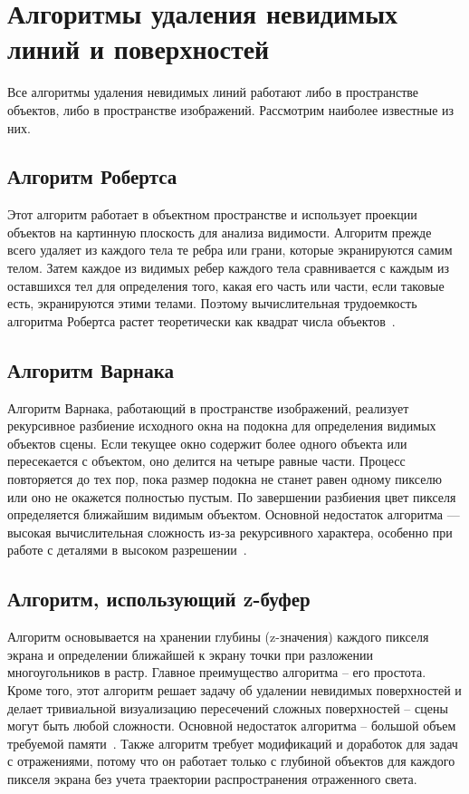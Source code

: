 \section{Алгоритмы удаления невидимых линий и поверхностей}
Все алгоритмы удаления невидимых линий работают либо в пространстве объектов, либо в пространстве изображений. Рассмотрим наиболее известные из них.
\subsection{Алгоритм Робертса}
Этот алгоритм работает в объектном пространстве и использует проекции объектов на картинную плоскость для анализа видимости. Алгоритм прежде всего удаляет из каждого тела те ребра или грани, которые экранируются самим телом. Затем каждое из видимых ребер каждого тела сравнивается с каждым из оставшихся тел для определения того, какая его часть или части, если таковые есть, экранируются этими телами. Поэтому вычислительная трудоемкость алгоритма Робертса растет теоретически как квадрат числа объектов~\cite{lit1,lit2}.

\subsection{Алгоритм Варнака}
Алгоритм Варнака, работающий в пространстве изображений, реализует рекурсивное разбиение исходного окна на подокна для определения видимых объектов сцены. Если текущее окно содержит более одного объекта или пересекается с объектом, оно делится на четыре равные части. Процесс повторяется до тех пор, пока размер подокна не станет равен одному пикселю или оно не окажется полностью пустым. По завершении разбиения цвет пикселя определяется ближайшим видимым объектом. Основной недостаток алгоритма — высокая вычислительная сложность из-за рекурсивного характера, особенно при работе с деталями в высоком разрешении~\cite{lit3}.

\subsection{Алгоритм, использующий z-буфер}

Алгоритм основывается на хранении глубины (z-значения) каждого пикселя экрана и определении ближайшей к экрану точки при разложении многоугольников в растр.
Главное преимущество алгоритма -- его простота. Кроме того, этот алгоритм решает задачу об удалении невидимых поверхностей и делает тривиальной визуализацию пересечений сложных поверхностей -- сцены могут быть любой сложности.
Основной недостаток алгоритма -- большой объем требуемой памяти~\cite{lit1}. Также алгоритм требует модификаций и доработок для задач с отражениями, потому что он работает только с глубиной объектов для каждого пикселя экрана без учета траектории распространения отраженного света.


